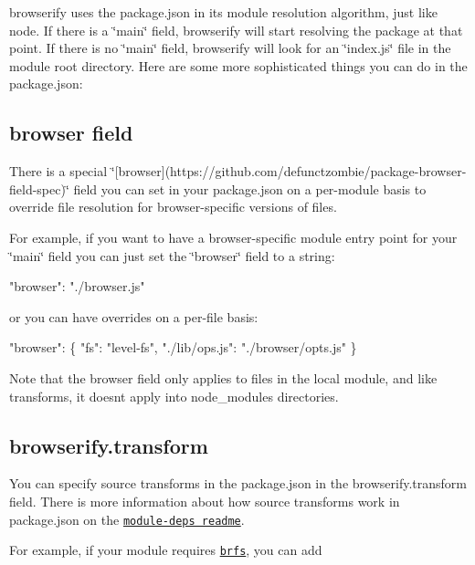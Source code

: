 browserify uses the {\ttfamily package.\+json} in its module resolution algorithm, just like node. If there is a {\ttfamily \char`\"{}main\char`\"{}} field, browserify will start resolving the package at that point. If there is no {\ttfamily \char`\"{}main\char`\"{}} field, browserify will look for an {\ttfamily \char`\"{}index.\+js\char`\"{}} file in the module root directory. Here are some more sophisticated things you can do in the package.\+json\+:

\subsection*{browser field}

There is a special \char`\"{}\mbox{[}browser\mbox{]}(https\+://github.\+com/defunctzombie/package-\/browser-\/field-\/spec)\char`\"{} field you can set in your package.\+json on a per-\/module basis to override file resolution for browser-\/specific versions of files.

For example, if you want to have a browser-\/specific module entry point for your {\ttfamily \char`\"{}main\char`\"{}} field you can just set the {\ttfamily \char`\"{}browser\char`\"{}} field to a string\+:


\begin{DoxyCode}
"browser": "./browser.js"
\end{DoxyCode}


or you can have overrides on a per-\/file basis\+:


\begin{DoxyCode}
"browser": \{
  "fs": "level-fs",
  "./lib/ops.js": "./browser/opts.js"
\}
\end{DoxyCode}


Note that the browser field only applies to files in the local module, and like transforms, it doesn\textquotesingle{}t apply into {\ttfamily node\+\_\+modules} directories.

\subsection*{browserify.\+transform}

You can specify source transforms in the package.\+json in the {\ttfamily browserify.\+transform} field. There is more information about how source transforms work in package.\+json on the \href{https://github.com/browserify/module-deps#transforms}{\tt module-\/deps readme}.

For example, if your module requires \href{https://www.npmjs.com/package/brfs}{\tt brfs}, you can add


